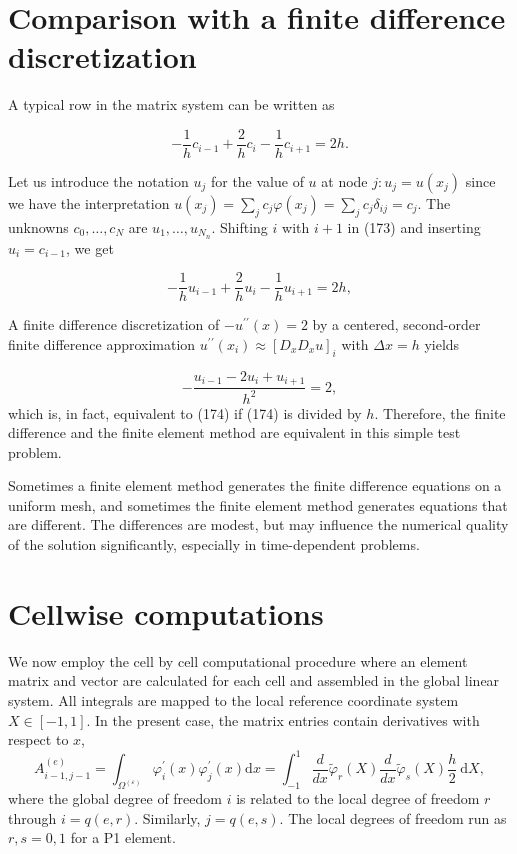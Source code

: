 \documentclass[../main.tex]{subfiles}
\begin{document}
	\section[Comparison with a finite difference discretization]{Comparison with a finite difference discretization}
		\noindent A typical row in the matrix system can be written as
	
		\begin{equation}
		\label{eqa173}
			-\frac{1}{h} c_{i-1}+\frac{2}{h} c_{i}-\frac{1}{h} c_{i+1}=2 h .
		\end{equation}
	
		\noindent Let us introduce the notation $u_{j}$ for the value of $u$ at node $j: u_{j}=u\left(x_{j}\right)$ since we have the interpretation $u\left(x_{j}\right)=\sum_{j} c_{j} \varphi\left(x_{j}\right)=\sum_{j} c_{j} \delta_{i j}=c_{j}$. The unknowns $c_{0}, \ldots, c_{N}$ are $u_{1}, \ldots, u_{N_{n}}$. Shifting $i$ with $i+1$ in (173) and inserting $u_{i}=c_{i-1}$, we get
	
		\begin{equation}
		\label{eqa174}
			-\frac{1}{h} u_{i-1}+\frac{2}{h} u_{i}-\frac{1}{h} u_{i+1}=2 h,
		\end{equation}
	
		A finite difference discretization of $-u^{\prime \prime}(x)=2$ by a centered, second-order finite difference approximation $u^{\prime \prime}\left(x_{i}\right) \approx\left[D_{x} D_{x} u\right]_{i}$ with $\Delta x=h$ yields
	
		\begin{equation}
		\label{eqa175}
			-\frac{u_{i-1}-2 u_{i}+u_{i+1}}{h^{2}}=2,
		\end{equation}
		which is, in fact, equivalent to (174) if (174) is divided by $h$. Therefore, the finite difference and the finite element method are equivalent in this simple test problem.
		
		Sometimes a finite element method generates the finite difference equations on a uniform mesh, and sometimes the finite element method generates equations that are different. The differences are modest, but may influence the numerical quality of the solution significantly, especially in time-dependent problems.\bigbreak 
		
\section[Cellwise computations]{Cellwise computations}
	\label{sec:sec_13_4}
	\noindent We now employ the cell by cell computational procedure where an element matrix and vector are calculated for each cell and assembled in the global linear system. All integrals are mapped to the local reference coordinate system $X \in[-1,1]$. In the present case, the matrix entries contain derivatives with respect to $x$,
	$$
	A_{i-1, j-1}^{(e)}=\int_{\Omega^{(\varepsilon)}} \varphi_{i}^{\prime}(x) \varphi_{j}^{\prime}(x) \mathrm{d} x=\int_{-1}^{1} \frac{d}{d x} \tilde{\varphi}_{r}(X) \frac{d}{d x} \tilde{\varphi}_{s}(X) \frac{h}{2} \mathrm{~d} X,
	$$
	where the global degree of freedom $i$ is related to the local degree of freedom $r$ through $i=q(e, r)$. Similarly, $j=q(e, s)$. The local degrees of freedom run as $r, s=0,1$ for a P1 element.\bigbreak
\end{document}
